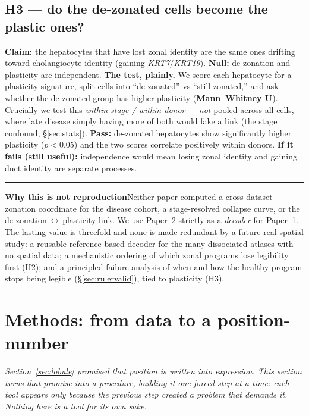 \documentclass[11pt]{article}
\newcommand{\aside}[2]{\par\medskip\noindent\textcolor{teal0}{\rule{2pt}{\baselineskip}}\quad\textbf{\textcolor{teal0}{#1}}\quad #2\par\medskip}
\newcommand{\gene}[1]{\textit{#1}}
\begin{document}
\subsection{H3 --- do the de-zonated cells become the plastic ones?}

\textbf{Claim:} the hepatocytes that have lost zonal identity are the same ones drifting toward
cholangiocyte identity (gaining \gene{KRT7}/\gene{KRT19}). \textbf{Null:} de-zonation and plasticity
are independent. \textbf{The test, plainly.} We score each hepatocyte for a plasticity signature, split
cells into ``de-zonated'' vs ``still-zonated,'' and ask whether the de-zonated group has higher
plasticity (\textbf{Mann--Whitney U}). Crucially we test this \emph{within stage / within donor} ---
\emph{not} pooled across all cells, where late disease simply having more of both would fake a link (the
stage confound, \S\ref{sec:stats}). \textbf{Pass:} de-zonated hepatocytes show significantly higher
plasticity ($p<0.05$) and the two scores correlate positively within donors. \textbf{If it fails (still
useful):} independence would mean losing zonal identity and gaining duct identity are separate processes.

\aside{Why this is not reproduction}{Neither paper computed a cross-dataset zonation coordinate for the
disease cohort, a stage-resolved collapse curve, or the de-zonation\,$\leftrightarrow$\,plasticity link.
We use Paper~2 strictly as a \emph{decoder} for Paper~1. The lasting value is threefold and none is made
redundant by a future real-spatial study: a reusable reference-based decoder for the many dissociated
atlases with no spatial data; a mechanistic ordering of which zonal programs lose legibility first (H2);
and a principled failure analysis of when and how the healthy program stops being legible
(\S\ref{sec:rulervalid}), tied to plasticity (H3).}

\clearpage
\section{Methods: from data to a position-number}

\noindent\emph{Section~\ref{sec:lobule} promised that position is written into expression. This section
turns that promise into a procedure, building it one forced step at a time: each tool appears only
because the previous step created a problem that demands it. Nothing here is a tool for its own sake.}
\end{document}
